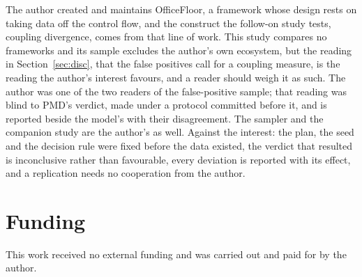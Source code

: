 \documentclass[11pt,a4paper]{article}
\begin{document}
The author created and maintains OfficeFloor, a framework whose design rests
on taking data off the control flow, and the construct the follow-on study
tests, coupling divergence, comes from that line of work. This study compares
no frameworks and its sample excludes the author's own ecosystem, but the
reading in Section~\ref{sec:disc}, that the false positives call for a
coupling measure, is the reading the author's interest favours, and a reader
should weigh it as such. The author was one of the two readers of the
false-positive sample; that reading was blind to PMD's verdict, made under a
protocol committed before it, and is reported beside the model's with their
disagreement. The sampler and the companion study are the author's as well.
Against the interest: the plan, the seed and the decision rule were fixed
before the data existed, the verdict that resulted is inconclusive rather than
favourable, every deviation is reported with its effect, and a replication
needs no cooperation from the author.

\section*{Funding}

This work received no external funding and was carried out and paid for by the
author.
\end{document}

